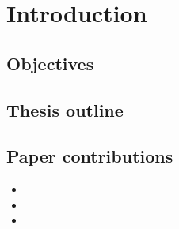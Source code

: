 \chapter{Introduction}

\section{Objectives}
\section{Thesis outline}
\section{Paper contributions}

\begin{itemize}
\item {}
\item {}
\item {}
\end{itemize}
